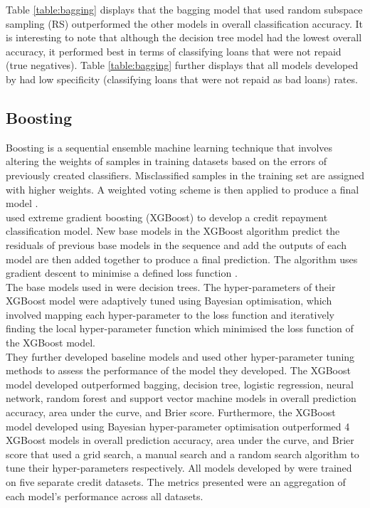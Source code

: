 \vspace{15pt}

Table \ref{table:bagging} displays that the bagging model that used random subspace sampling (RS) outperformed the other models in overall classification accuracy. It is interesting to note that although the decision tree model had the lowest overall accuracy, it performed best in terms of classifying loans that were not repaid (true negatives). Table \ref{table:bagging} further displays that all models developed by \textcite{BagWang} had low specificity (classifying loans that were not repaid as bad loans) rates. 


\subsection{Boosting}

Boosting is a sequential ensemble machine learning technique that involves altering the weights of samples in training datasets based on the errors of previously created classifiers. Misclassified samples in the training set are assigned with higher weights. A weighted voting scheme is then applied to produce a final model \parencite{BoostingFreund}. \\

\textcite{Ensemble} used extreme gradient boosting (XGBoost) to develop a credit repayment classification model. New base models in the XGBoost algorithm predict the residuals of previous base models in the sequence and add the outputs of each model are then added together to produce a final prediction. The algorithm uses gradient descent to minimise a defined loss function \parencite{BoostingCowan}. \\

The base models used in \textcite{Ensemble} were decision trees. The hyper-parameters of their XGBoost model were adaptively tuned using Bayesian optimisation, which involved mapping each hyper-parameter to the loss function and iteratively finding the local hyper-parameter function which minimised the loss function of the XGBoost model. \\

They further developed baseline models and used other hyper-parameter tuning methods to assess the performance of the model they developed. The XGBoost model developed outperformed bagging, decision tree, logistic regression, neural network, random forest and support vector machine models in overall prediction accuracy, area under the curve, and Brier score. Furthermore, the XGBoost model developed using Bayesian hyper-parameter optimisation outperformed 4 XGBoost models in overall prediction accuracy, area under the curve, and Brier score that used a grid search, a manual search and a random search algorithm to tune their hyper-parameters respectively. All models developed by \textcite{Ensemble} were trained on five separate credit datasets. The metrics presented were an aggregation of each model's performance across all datasets. \\


